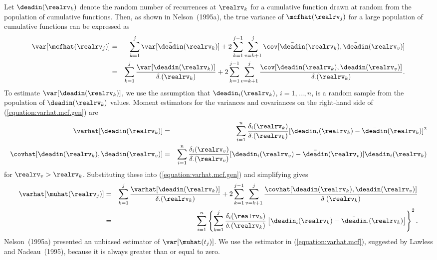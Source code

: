 Let $\deadin(\realrv_{k})$ denote the random number of recurrences
at $\realrv_{k}$ for a cumulative function drawn at random from the
population of cumulative functions.  Then, as
shown in Nelson~(1995a), the true variance of $\mcfhat(\realrv_{j})$
for a large population of cumulative functions can be expressed as
\begin{eqnarray}
\var[\mcfhat(\realrv_{j})]&=&
\sum_{k=1}^{j} \var[\bar{\deadin}(\realrv_{k})]+ 2 \sum_{k=1}^{j-1} \sum_{v=k+1}^{j}
\cov [\bar{\deadin}(\realrv_{k}),\bar{\deadin}(\realrv_{v})]
\nonumber \\
\label{equation:varhat.mcf.gen}
&=&
\sum_{k=1}^{j} 
\frac{
\var[\deadin(\realrv_{k})]
     }
     {
\delta_{\cdot}(\realrv_{k}) 
     }+ 2 \sum_{k=1}^{j-1} \sum_{v=k+1}^{j}
\frac{
\cov [\deadin(\realrv_{k}),\deadin(\realrv_{v})]
     }
     {
\delta_{\cdot}(\realrv_{k})
     }.
\end{eqnarray}
To estimate $\var[\deadin(\realrv_{k})]$, we use the assumption that
$\deadin_{i}(\realrv_{k})$, $i=1,\dots,n$, is a random sample from
the population of $\deadin(\realrv_{k})$ values. Moment estimators for 
the variances and covariances on the right-hand side of 
(\ref{equation:varhat.mcf.gen}) are
\begin{eqnarray}
\label{equation:var.deadin}
\varhat[\deadin(\realrv_{k})]&=&
\sum_{i=1}^{n}
\frac{
\delta_{i}(\realrv_{k})
     }
     {
\delta_{\cdot}(\realrv_{k})
     }
[\deadin_{i}(\realrv_{k})
-\bar{\deadin}(\realrv_{k})]^{2}
\\
\label{equation:cov.deadin}
\covhat[\deadin(\realrv_{k}),\deadin(\realrv_{v})]
&=&
\sum_{i=1}^{n}
\frac{
\delta_{i}(\realrv_{v})
     }
     {
\delta_{\cdot}(\realrv_{v})
     }
[\deadin_{i}(\realrv_{v})
-\bar{\deadin}(\realrv_{v})]
\deadin_{i}(\realrv_{k})
\end{eqnarray}
for $\realrv_{v} > \realrv_{k}$. Substituting these into (\ref{equation:varhat.mcf.gen}) and simplifying
gives
\begin{eqnarray}
\varhat[\muhat(\realrv_{j})]
&=&
\sum_{k=1}^{j} 
\frac{
\varhat[\deadin(\realrv_{k})]
     }
     {
\delta_{\cdot}(\realrv_{k}) 
     }+ 2 \sum_{k=1}^{j-1} \sum_{v=k+1}^{j}
\frac{
\covhat[\deadin(\realrv_{k}),\deadin(\realrv_{v})]
     }
     {
\delta_{\cdot}(\realrv_{k})
     }
 \nonumber \\
\label{equation:varhat.mcf}
&=&
\sum_{i=1}^{n}
\left \{
\sum_{k=1}^{j}
\frac{
\delta_{i}(\realrv_{k})
     }
     {
\delta_{\cdot}(\realrv_{k})
     }
\left [
\deadin_{i}(\realrv_{k})-
\bar{\deadin}_{\cdot}(\realrv_{k})
\right ]
\right \}^{2}.
\end{eqnarray}
Nelson~(1995a) presented an unbiased estimator of
$\var[\muhat(t_{j})]$.  We use the estimator in
(\ref{equation:varhat.mcf}), suggested by Lawless and
Nadeau~(1995), because it is always greater than or equal to zero.


